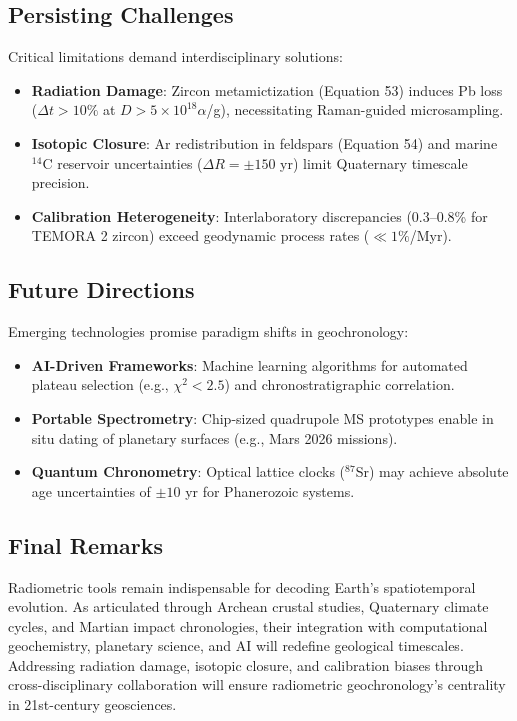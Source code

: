 \documentclass{article}
\begin{document}
\subsection{Persisting Challenges}
Critical limitations demand interdisciplinary solutions:  
\begin{itemize}  
\item \textbf{Radiation Damage}: Zircon metamictization (Equation 53) induces Pb loss ($\Delta t >10\%$ at $D >5 \times 10^{18} \alpha$/g), necessitating Raman-guided microsampling.  
\item \textbf{Isotopic Closure}: Ar redistribution in feldspars (Equation 54) and marine $^{14}$C reservoir uncertainties ($\Delta R = \pm 150$ yr) limit Quaternary timescale precision.  
\item \textbf{Calibration Heterogeneity}: Interlaboratory discrepancies (0.3--0.8\% for TEMORA 2 zircon) exceed geodynamic process rates ($\ll 1\%$/Myr).  
\end{itemize}

\subsection{Future Directions}
Emerging technologies promise paradigm shifts in geochronology:  
\begin{itemize}  
\item \textbf{AI-Driven Frameworks}: Machine learning algorithms for automated plateau selection (e.g., $\chi^2 <2.5$) and chronostratigraphic correlation.  
\item \textbf{Portable Spectrometry}: Chip-sized quadrupole MS prototypes enable in situ dating of planetary surfaces (e.g., Mars 2026 missions).  
\item \textbf{Quantum Chronometry}: Optical lattice clocks ($^{87}$Sr) may achieve absolute age uncertainties of $\pm 10$ yr for Phanerozoic systems.  
\end{itemize}

\subsection{Final Remarks}
Radiometric tools remain indispensable for decoding Earth's spatiotemporal evolution. As articulated through Archean crustal studies, Quaternary climate cycles, and Martian impact chronologies, their integration with computational geochemistry, planetary science, and AI will redefine geological timescales. Addressing radiation damage, isotopic closure, and calibration biases through cross-disciplinary collaboration will ensure radiometric geochronology's centrality in 21st-century geosciences.
\end{document}
